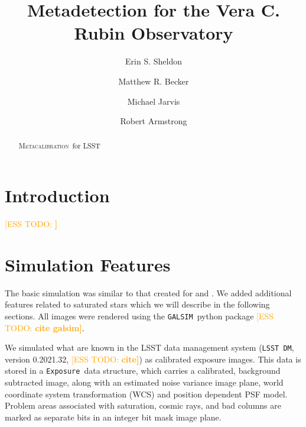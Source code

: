 \documentclass[twocolumn,twocolappendix,astrosym]{openjournal}
\newcommand{\esstodo}[1]{\textcolor{orange}{[ESS TODO: \bf #1]}}
\newcommand{\galsim}{\texttt{GALSIM}}
\newcommand{\calexp}{\texttt{Exposure}}
\newcommand{\dm}{\texttt{LSST DM}}
\newcommand{\Mcal}{\textsc{Metacalibration}}
\newcommand{\Mdet}{\textsc{Metadetection}}
\begin{document}



\title{Metadetection for the Vera C. Rubin Observatory}

\author{Erin S. Sheldon}
\author{Matthew R. Becker}
\author{Michael Jarvis}
\author{Robert Armstrong}


\begin{abstract}

    \Mcal\ for LSST

\end{abstract}


\section{Introduction} \label{sec:intro}

\esstodo{}

\section{Simulation Features} \label{sec:sim}

The basic simulation was similar to that created for \citep{mdet20} and
\citet{BeckerMdetCoadd}. We added additional features related to saturated
stars which we will describe in the following sections.  All images were
rendered using the \galsim\ python package \esstodo{ cite galsim}.

We simulated what are known in the LSST data management system (\dm, version
0.2021.32, \esstodo{cite}) as calibrated exposure images.  This data is stored
in a \calexp\ data structure, which carries a calibrated, background subtracted
image, along with an estimated noise variance image plane, world coordinate
system transformation (WCS) and position dependent PSF model.  Problem areas
associated with saturation, cosmic rays, and bad columns are marked as separate
bits in an integer bit mask image plane.
\end{document}
